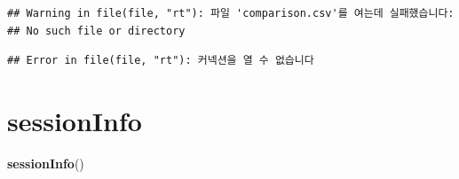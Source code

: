 \documentclass[]{krantz}
\makeatletter
\newenvironment{Shaded}{\begin{snugshade}}{\end{snugshade}}
\newcommand{\KeywordTok}[1]{\textcolor[rgb]{0.13,0.29,0.53}{\textbf{#1}}}
\newcommand{\NormalTok}[1]{#1}
\newenvironment{kframe}{%
\medskip{}
\setlength{\fboxsep}{.8em}
 \def\at@end@of@kframe{}%
 \ifinner\ifhmode%
  \def\at@end@of@kframe{\end{minipage}}%
  \begin{minipage}{\columnwidth}%
 \fi\fi%
 \def\FrameCommand##1{\hskip\@totalleftmargin \hskip-\fboxsep
 \colorbox{shadecolor}{##1}\hskip-\fboxsep
     \hskip-\linewidth \hskip-\@totalleftmargin \hskip\columnwidth}%
 \MakeFramed {\advance\hsize-\width
   \@totalleftmargin\z@ \linewidth\hsize
   \@setminipage}}%
 {\par\unskip\endMakeFramed%
 \at@end@of@kframe}
\renewenvironment{Shaded}{\begin{kframe}}{\end{kframe}}
\theoremstyle{definition}
\theoremstyle{definition}
\theoremstyle{definition}
\theoremstyle{remark}
\makeatother
\begin{document}
\begin{verbatim}
## Warning in file(file, "rt"): 파일 'comparison.csv'를 여는데 실패했습니다:
## No such file or directory
\end{verbatim}

\begin{verbatim}
## Error in file(file, "rt"): 커넥션을 열 수 없습니다
\end{verbatim}

\section*{sessionInfo}\label{sessioninfo}

\begin{Shaded}
\begin{Highlighting}[]
\KeywordTok{sessionInfo}\NormalTok{()}
\end{Highlighting}
\end{Shaded}
\end{document}
